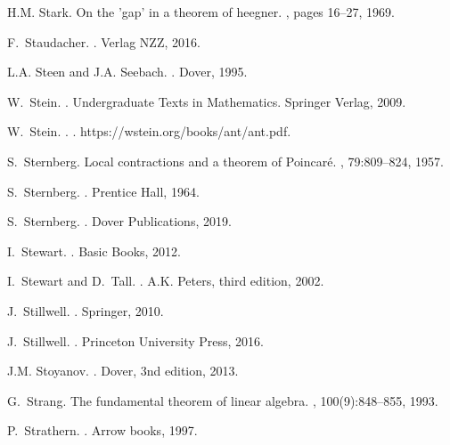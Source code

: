 \documentclass[12pt]{amsart}
\newcounter{example}    \def\example#1{ \item \fontsize{12}{15} \selectfont #1 \fontsize{12}{15} \selectfont }
\begin{document}
\begin{thebibliography}{100}
H.M. Stark.
\newblock On the 'gap' in a theorem of heegner.
, pages 16--27, 1969.

F.~Staudacher.
.
\newblock Verlag NZZ, 2016.

L.A. Steen and J.A. Seebach.
.
\newblock Dover, 1995.

W.~Stein.
.
\newblock Undergraduate Texts in Mathematics. Springer Verlag, 2009.

W.~Stein.
.
.
\newblock https://wstein.org/books/ant/ant.pdf.

S.~Sternberg.
\newblock Local contractions and a theorem of {P}oincar\'e.
, 79:809--824, 1957.

S.~Sternberg.
.
\newblock Prentice Hall, 1964.

S.~Sternberg.
.
\newblock Dover Publications, 2019.

I.~Stewart.
.
\newblock Basic Books, 2012.

I.~Stewart and D.~Tall.
.
\newblock A.K. Peters, third edition, 2002.

J.~Stillwell.
.
\newblock Springer, 2010.

J.~Stillwell.
.
\newblock Princeton University Press, 2016.

J.M. Stoyanov.
.
\newblock Dover, 3nd edition, 2013.

G.~Strang.
\newblock The fundamental theorem of linear algebra.
, 100(9):848--855, 1993.

P.~Strathern.
.
\newblock Arrow books, 1997.


\end{thebibliography}
\end{document}
